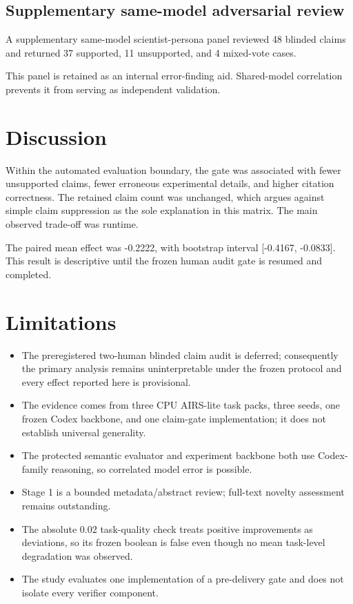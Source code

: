 \documentclass[11pt]{article}
\begin{document}
\subsection{Supplementary same-model adversarial review}
A supplementary same-model scientist-persona panel reviewed 48 blinded claims and returned 37 supported, 11 unsupported, and 4 mixed-vote cases.

This panel is retained as an internal error-finding aid. Shared-model correlation prevents it from serving as independent validation.

\section{Discussion}
Within the automated evaluation boundary, the gate was associated with fewer unsupported claims, fewer erroneous experimental details, and higher citation correctness. The retained claim count was unchanged, which argues against simple claim suppression as the sole explanation in this matrix. The main observed trade-off was runtime.

The paired mean effect was -0.2222, with bootstrap interval [-0.4167, -0.0833]. This result is descriptive until the frozen human audit gate is resumed and completed.

\section{Limitations}
\begin{itemize}[leftmargin=*]
\item The preregistered two-human blinded claim audit is deferred; consequently the primary analysis remains uninterpretable under the frozen protocol and every effect reported here is provisional.
\item The evidence comes from three CPU AIRS-lite task packs, three seeds, one frozen Codex backbone, and one claim-gate implementation; it does not establish universal generality.
\item The protected semantic evaluator and experiment backbone both use Codex-family reasoning, so correlated model error is possible.
\item Stage 1 is a bounded metadata/abstract review; full-text novelty assessment remains outstanding.
\item The absolute 0.02 task-quality check treats positive improvements as deviations, so its frozen boolean is false even though no mean task-level degradation was observed.
\item The study evaluates one implementation of a pre-delivery gate and does not isolate every verifier component.
\end{itemize}
\end{document}

